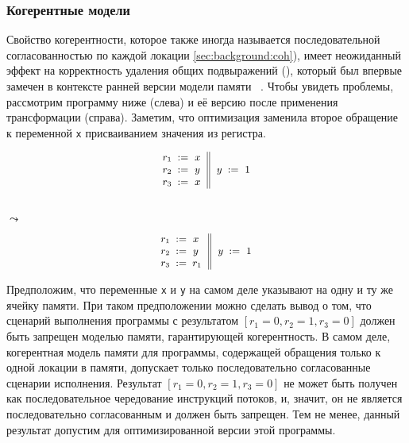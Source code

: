 \subsubsection{Когерентные модели}
\label{sec:analysis:coh}

Свойство когерентности, которое также иногда называется последовательной согласованностью 
по каждой локации \cref{sec:background:coh}), 
имеет неожиданный эффект на корректность удаления общих подвыражений (\CSE), 
который был впервые замечен в контексте ранней версии модели памяти \Java~\cite{Pugh:JAVA99}.
Чтобы увидеть проблемы, рассмотрим программу ниже (слева) 
и её версию после применения трансформации \CSE (справа).
Заметим, что оптимизация заменила второе обращение 
к переменной \texttt{x} присваиванием значения из регистра. 

\begin{minipage}{0.45\linewidth}
\begin{equation*}
\small
\inarrII{
  \readInst{}{r_1}{x}      \\
  \readInst{}{r_2}{y}      \\
  \readInst{}{r_3}{x}      \\
}{
  \writeInst{}{y}{1}       \\
}
\label{ex:coh-rr}
\end{equation*}
\end{minipage}\hfill%
\begin{minipage}{0.05\linewidth}
\Large~\\ $\leadsto$
\end{minipage}\hfill%
\begin{minipage}{0.45\linewidth}
\begin{equation*}
\small
\inarrII{
  \readInst{}{r_1}{x}      \\
  \readInst{}{r_2}{y}      \\
  \assignInst{r_3}{r_1}    \\
}{
  \writeInst{}{y}{1}       \\
}
\label{ex:coh-rr}
\end{equation*}
\end{minipage}

Предположим, что переменные \texttt{x} и \texttt{y} 
на самом деле указывают на одну и ту же ячейку памяти.  
При таком предположении можно сделать вывод о том, что 
сценарий выполнения программы с результатом ${[r_1=0, r_2=1, r_3=0]}$
должен быть запрещен моделью памяти, гарантирующей когерентность. 
В самом деле, когерентная модель памяти для программы, 
содержащей обращения только к одной локации в памяти, 
допускает только последовательно согласованные сценарии исполнения.
Результат ${[r_1=0, r_2=1, r_3=0]}$ не может быть получен
как последовательное чередование инструкций потоков, 
и, значит, он не является последовательно согласованным и должен быть запрещен.
Тем не менее, данный результат допустим для 
оптимизированной версии этой программы. 

